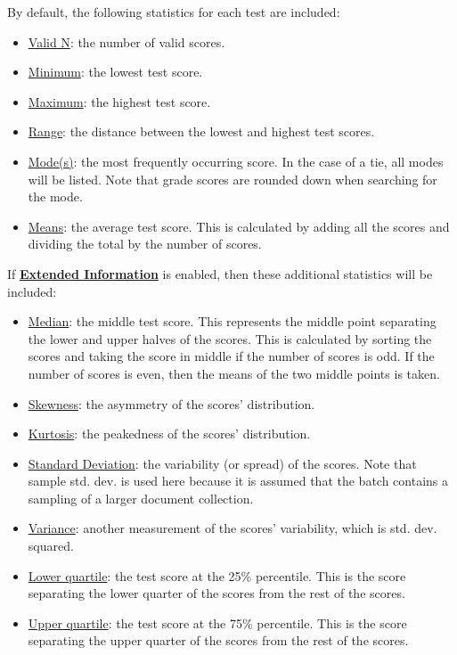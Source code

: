 \documentclass[
]{book}
\providecommand{\tightlist}{%
  \setlength{\itemsep}{0pt}\setlength{\parskip}{0pt}}
\theoremstyle{definition}
\theoremstyle{definition}
\theoremstyle{definition}
\theoremstyle{definition}
\theoremstyle{remark}
\begin{document}
By default, the following statistics for each test are included:

\begin{itemize}
\tightlist
\item
  \protect\hyperlink{stat-terms}{Valid N}: the number of valid scores.
\item
  \protect\hyperlink{stat-terms}{Minimum}: the lowest test score.
\item
  \protect\hyperlink{stat-terms}{Maximum}: the highest test score.
\item
  \protect\hyperlink{stat-terms}{Range}: the distance between the lowest and highest test scores.
\item
  \protect\hyperlink{stat-terms}{Mode(s)}: the most frequently occurring score. In the case of a tie, all modes will be listed. Note that grade scores are rounded down when searching for the mode.
\item
  \protect\hyperlink{stat-terms}{Means}: the average test score. This is calculated by adding all the scores and dividing the total by the number of scores.
\end{itemize}

If \protect\hyperlink{options-summary-report}{\textbf{Extended Information}} is enabled, then these additional statistics will be included:

\begin{itemize}
\tightlist
\item
  \protect\hyperlink{stat-terms}{Median}: the middle test score. This represents the middle point separating the lower and upper halves of the scores. This is calculated by sorting the scores and taking the score in middle if the number of scores is odd. If the number of scores is even, then the means of the two middle points is taken.
\item
  \protect\hyperlink{stat-terms}{Skewness}: the asymmetry of the scores' distribution.
\item
  \protect\hyperlink{stat-terms}{Kurtosis}: the peakedness of the scores' distribution.
\item
  \protect\hyperlink{stat-terms}{Standard Deviation}: the variability (or spread) of the scores. Note that sample std. dev. is used here because it is assumed that the batch contains a sampling of a larger document collection.
\item
  \protect\hyperlink{stat-terms}{Variance}: another measurement of the scores' variability, which is std. dev. squared.
\item
  \protect\hyperlink{stat-terms}{Lower quartile}: the test score at the 25\% percentile. This is the score separating the lower quarter of the scores from the rest of the scores.
\item
  \protect\hyperlink{stat-terms}{Upper quartile}: the test score at the 75\% percentile. This is the score separating the upper quarter of the scores from the rest of the scores.
\end{itemize}
\end{document}
